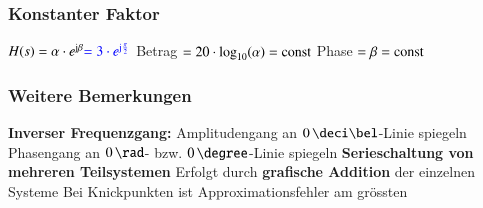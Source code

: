 \begin{minipage}[t]{0.48\columnwidth}
    
\end{minipage}
\hfill
\begin{minipage}[t]{0.48\columnwidth}
    
\end{minipage}


\begin{minipage}[t]{0.48\columnwidth}
    \raggedright
    \subsubsection{Konstanter Faktor}

    \begin{outline}
        \1 $H(s) = \alpha \cdot e^{\mathrm{j} \beta} {\color{blue}= 3 \cdot e^{\mathrm{j} \frac{\pi}{2}}}$
            \2 Betrag $= 20 \cdot \log_{10}(\alpha) = \mathrm{const}$
            \2 Phase $= \beta = \mathrm{const}$
    \end{outline}
    
    
\end{minipage}
\hfill
\begin{minipage}[t]{0.48\columnwidth}
    \raggedright
    \subsubsection{Weitere Bemerkungen}

    \begin{outline}
        \1 \textbf{Inverser Frequenzgang:}
            \2 Amplitudengang an $0 \, \deci \bel$-Linie spiegeln
            \2 Phasengang an $0 \, \rad$- bzw. $0 \, \degree$-Linie spiegeln
        \1 \textbf{Serieschaltung von mehreren Teilsystemen}
            \2 Erfolgt durch \textbf{grafische Addition} der einzelnen Systeme
        \1 Bei Knickpunkten ist Approximationsfehler am grössten
    \end{outline}

\end{minipage}




